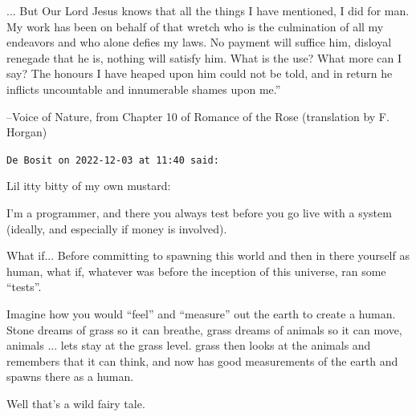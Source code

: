 \begin{footnotesize}
\begin{sffamily}
... But Our Lord Jesus knows that all the things I have mentioned, I did for man. My work has been on behalf of that wretch who is the culmination of all my endeavors and who alone defies my laws. No payment will suffice him, disloyal renegade that he is, nothing will satisfy him. What is the use? What more can I say? The honours I have heaped upon him could not be told, and in return he inflicts uncountable and innumerable shames upon me.''

--Voice of Nature, from Chapter 10 of Romance of the Rose (translation by F. Horgan)

\hfill

\texttt{De Bosit on 2022-12-03 at 11:40 said:}

Lil itty bitty of my own mustard:

I'm a programmer, and there you always test before you go live with a system (ideally, and especially if money is involved).

What if... Before committing to spawning this world and then in there yourself as human, what if, whatever was before the inception of this universe, ran some ``tests''.

Imagine how you would ``feel'' and ``measure'' out the earth to create a human. Stone dreams of grass so it can breathe, grass dreams of animals so it can move, animals ... lets stay at the grass level. grass then looks at the animals and remembers that it can think, and now has good measurements of the earth and spawns there as a human.

Well that's a wild fairy tale.


\hfill

\end{sffamily}
\end{footnotesize}

